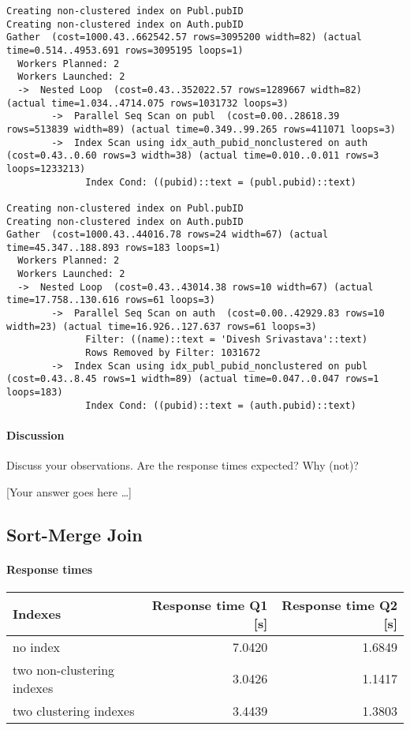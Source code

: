 \documentclass[11pt]{scrartcl}
\newcommand{\youranswerhere}{[Your answer goes here \ldots]}
\begin{document}
{\small
\parskip0pt\begin{verbatim}
Creating non-clustered index on Publ.pubID
Creating non-clustered index on Auth.pubID
Gather  (cost=1000.43..662542.57 rows=3095200 width=82) (actual time=0.514..4953.691 rows=3095195 loops=1)
  Workers Planned: 2
  Workers Launched: 2
  ->  Nested Loop  (cost=0.43..352022.57 rows=1289667 width=82) (actual time=1.034..4714.075 rows=1031732 loops=3)
        ->  Parallel Seq Scan on publ  (cost=0.00..28618.39 rows=513839 width=89) (actual time=0.349..99.265 rows=411071 loops=3)
        ->  Index Scan using idx_auth_pubid_nonclustered on auth  (cost=0.43..0.60 rows=3 width=38) (actual time=0.010..0.011 rows=3 loops=1233213)  
              Index Cond: ((pubid)::text = (publ.pubid)::text)

Creating non-clustered index on Publ.pubID
Creating non-clustered index on Auth.pubID
Gather  (cost=1000.43..44016.78 rows=24 width=67) (actual time=45.347..188.893 rows=183 loops=1)
  Workers Planned: 2
  Workers Launched: 2
  ->  Nested Loop  (cost=0.43..43014.38 rows=10 width=67) (actual time=17.758..130.616 rows=61 loops=3)
        ->  Parallel Seq Scan on auth  (cost=0.00..42929.83 rows=10 width=23) (actual time=16.926..127.637 rows=61 loops=3)
              Filter: ((name)::text = 'Divesh Srivastava'::text)
              Rows Removed by Filter: 1031672
        ->  Index Scan using idx_publ_pubid_nonclustered on publ  (cost=0.43..8.45 rows=1 width=89) (actual time=0.047..0.047 rows=1 loops=183)      
              Index Cond: ((pubid)::text = (auth.pubid)::text)
\end{verbatim}}

\paragraph{Discussion}

Discuss your observations. Are the response times expected? Why (not)?

\youranswerhere{}

\subsection*{Sort-Merge Join}

\paragraph{Response times}\mbox{}

\begin{table}[H]
  \centering
  \begin{tabular}{l|r|r}
    Indexes & Response time Q1 [s] & Response time Q2 [s] \tabularnewline
    \hline
    no index & 7.0420 & 1.6849 \tabularnewline
    two non-clustering indexes & 3.0426 & 1.1417 \tabularnewline
    two clustering indexes & 3.4439 & 1.3803 \tabularnewline
  \end{tabular}
\end{table}
\end{document}
